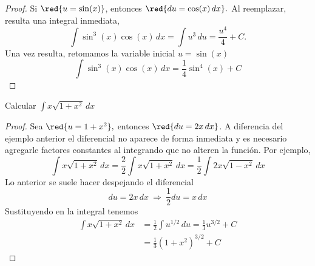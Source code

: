 \begin{proof}
Si  $\red{u=\sin(x)}$, entonces $\red{du=\cos(x)\,dx }.$ Al reemplazar, resulta una integral inmediata,
\begin{equation*}
\int \sin^{3}(x)\cos(x)\,dx=\int u^{3}\,du=\frac{u^4}{4}+C.
\end{equation*}
Una vez resulta, retomamos la variable inicial  $u=\sin(x)$
$$\displaystyle\int \sin^{3}(x)\cos(x)\,dx =\frac{1}{4}\sin^{4} (x) +C$$
\end{proof}



\begin{Ejemplo} Calcular $\displaystyle\int x\sqrt{1+x^{2}}\,dx$
 \end{Ejemplo}
 \begin{proof}

Sea $\red{u=1+x^{2}},$ entonces $\red{du=2x\,dx}$. A diferencia del ejemplo anterior el diferencial no aparece de forma inmediata y es necesario  agregarle factores constantes al integrando que no alteren la funci\'on. Por ejemplo,
$$\displaystyle\int x\sqrt{1+x^{2}}\,dx=\frac{2}{2}\displaystyle\int  x\sqrt{1+x^{2}}\,dx=\frac{1}{2}\displaystyle\int  2x\sqrt{1-x^{2}}\,dx $$
Lo anterior se suele hacer despejando  el diferencial
$$du=2x\,dx \  \Rightarrow \ \frac{1}{2} du=x\,dx $$
Sustituyendo en la integral tenemos
\begin{align*}
\displaystyle\int x\sqrt{1+x^{2}}\,dx &=\frac{1}{2}
\int u^{1/2}\,du=\frac{1}{3}u^{3/2}+C\\
&=\frac{1}{3}(1+x^{2})^{3/2}+C
\end{align*}
\end{proof}





